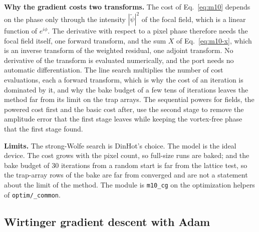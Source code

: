 \textbf{Why the gradient costs two transforms.} The cost of Eq.~\eqref{eq:m10} depends on the phase only through the intensity $|\tilde\psi|^2$ of the focal field, which is a linear function of $e^{i\phi}$. The derivative with respect to a pixel phase therefore needs the focal field itself, one forward transform, and the sum $X$ of Eq.~\eqref{eq:m10-x}, which is an inverse transform of the weighted residual, one adjoint transform. No derivative of the transform is evaluated numerically, and the port needs no automatic differentiation. The line search multiplies the number of cost evaluations, each a forward transform, which is why the cost of an iteration is dominated by it, and why the bake budget of a few tens of iterations leaves the method far from its limit on the trap arrays. The sequential powers for fields, the powered cost first and the basic cost after, use the second stage to remove the amplitude error that the first stage leaves while keeping the vortex-free phase that the first stage found.

\textbf{Limits.} The strong-Wolfe search is DinHot's choice. The model is the ideal device. The cost grows with the pixel count, so full-size runs are baked; and the bake budget of 30 iterations from a random start is far from the lattice test, so the trap-array rows of the bake are far from converged and are not a statement about the limit of the method. The module is \texttt{m10\_cg} on the optimization helpers of \texttt{optim/\_common}.

\subsection{Wirtinger gradient descent with Adam}\label{sec:m11}

